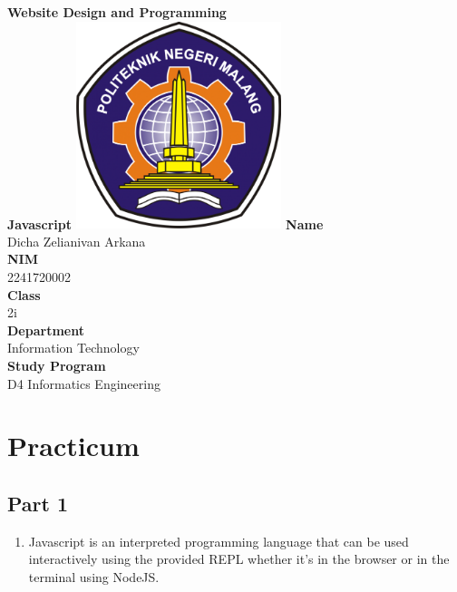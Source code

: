 \documentclass[12pt,titlepage]{article}
\newcommand{\vSubject}{Website Design and Programming}
\newcommand{\vSubtitle}{Javascript}
\newcommand{\vName}{Dicha Zelianivan Arkana}
\newcommand{\vNIM}{2241720002}
\newcommand{\vClass}{2i}
\newcommand{\vDepartment}{Information Technology}
\newcommand{\vStudyProgram}{D4 Informatics Engineering}
\begin{document}
\begin{titlepage}
    \centering
    \vfill
    {\bfseries\LARGE
        \vSubject\\
        \vskip0.25cm
        \vSubtitle
    }
    \vfill
    \includegraphics[width=6cm]{images/polinema-logo.png}
    \vfill
    {
        \textbf{Name}\\
        \vName\\
        \vskip0.5cm
        \textbf{NIM}\\
        \vNIM\\
        \vskip0.5cm
        \textbf{Class}\\
        \vClass\\
        \vskip0.5cm
        \textbf{Department}\\
        \vDepartment\\
        \vskip0.5cm
        \textbf{Study Program}\\
        \vStudyProgram
    }
\end{titlepage}

\tableofcontents

\pagebreak

\section{Practicum}
\subsection{Part 1}
\begin{enumerate}
    \item Javascript is an interpreted programming language that can be used interactively using the provided REPL whether it's in the browser or in the terminal using NodeJS.
\end{enumerate}
\end{document}
